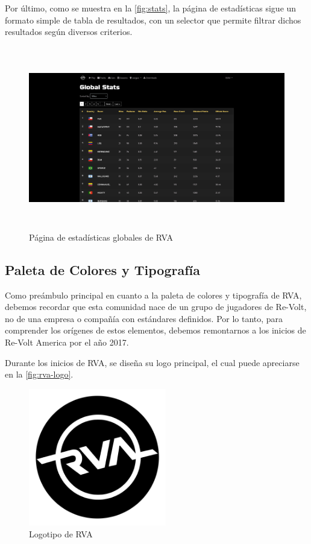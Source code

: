 Por último, como se muestra en la \autoref{fig:stats}, la página de estadísticas sigue un formato simple de tabla de resultados, con un selector que permite filtrar dichos resultados según diversos criterios.

\begin{figure}[H]
  \begin{center}
    \includegraphics[width=15cm, height=8cm]{img/stats.png} 
  \end{center}
  \caption[Página de estadísticas globales de RVA]{Página de estadísticas globales de RVA}
  \label{fig:stats}
\end{figure}

\subsection{Paleta de Colores y Tipografía}
Como preámbulo principal en cuanto a la paleta de colores y tipografía de RVA, debemos recordar que esta comunidad nace de un grupo de jugadores de Re-Volt, no de una empresa o compañía con estándares definidos. Por lo tanto, para comprender los orígenes de estos elementos, debemos remontarnos a los inicios de Re-Volt America por el año 2017.

Durante los inicios de RVA, se diseña su logo principal, el cual puede apreciarse en la \autoref{fig:rva-logo}.

\begin{figure}[H]
  \begin{center}
    \includegraphics[width=6cm, height=6cm]{img/rva.png} 
  \end{center}
  \caption[Logotipo de RVA]{Logotipo de RVA}
  \label{fig:rva-logo}
\end{figure}

